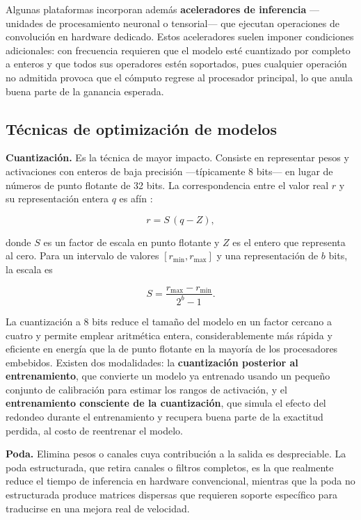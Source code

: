 Algunas plataformas incorporan además \textbf{aceleradores de inferencia}
—unidades de procesamiento neuronal o tensorial— que ejecutan operaciones
de convolución en hardware dedicado. Estos aceleradores suelen imponer
condiciones adicionales: con frecuencia requieren que el modelo esté
cuantizado por completo a enteros y que todos sus operadores estén
soportados, pues cualquier operación no admitida provoca que el cómputo
regrese al procesador principal, lo que anula buena parte de la ganancia
esperada.

\subsection{Técnicas de optimización de modelos}

\textbf{Cuantización.} Es la técnica de mayor impacto. Consiste en
representar pesos y activaciones con enteros de baja precisión —típicamente
8 bits— en lugar de números de punto flotante de 32 bits. La correspondencia
entre el valor real $r$ y su representación entera $q$ es afín
\citep{jacob2018}:

\begin{equation}
r = S\,(q - Z),
\label{eq:cuantizacion}
\end{equation}

\noindent donde $S$ es un factor de escala en punto flotante y $Z$ es el
entero que representa al cero. Para un intervalo de valores
$[r_{\min}, r_{\max}]$ y una representación de $b$ bits, la escala es

\begin{equation}
S = \frac{r_{\max} - r_{\min}}{2^{b} - 1}.
\label{eq:escala}
\end{equation}

La cuantización a 8 bits reduce el tamaño del modelo en un factor cercano a
cuatro y permite emplear aritmética entera, considerablemente más rápida y
eficiente en energía que la de punto flotante en la mayoría de los
procesadores embebidos. Existen dos modalidades: la \textbf{cuantización
posterior al entrenamiento}, que convierte un modelo ya entrenado usando un
pequeño conjunto de calibración para estimar los rangos de activación, y el
\textbf{entrenamiento consciente de la cuantización}, que simula el efecto
del redondeo durante el entrenamiento y recupera buena parte de la exactitud
perdida, al costo de reentrenar el modelo.

\textbf{Poda.} Elimina pesos o canales cuya contribución a la salida es
despreciable. La poda estructurada, que retira canales o filtros completos,
es la que realmente reduce el tiempo de inferencia en hardware
convencional, mientras que la poda no estructurada produce matrices
dispersas que requieren soporte específico para traducirse en una mejora
real de velocidad.

